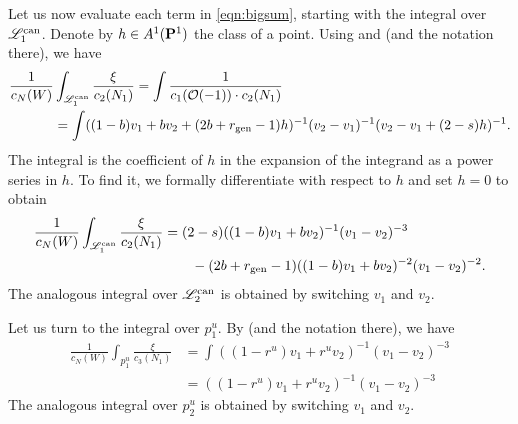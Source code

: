\documentclass{amsart}
\renewcommand{\O}{\mathcal O}
\begin{document}
Let us now evaluate each term in \eqref{eqn:bigsum}, starting with the integral over \(\mathscr L_1^{\rm can}\).
Denote by \(h \in A^1(\P^1)\) the class of a point.
Using  and  (and the notation there), we have
\begin{align*}
  \frac{1}{c_N(W)}&\int_{\mathscr L_1^{\rm can}} \frac{\xi}{c_2(N_1)} = \int \frac{1}{c_1(\O(-1)) \cdot c_2(N_1)} \\
  &= \int ((1-b)v_1+bv_2+ (2b+r_{\rm gen}-1)h)^{-1}(v_2-v_1)^{-1}(v_2-v_{1}+(2-s)h)^{-1}.
\end{align*}
The integral is the coefficient of \(h\) in the expansion of the integrand as a power series in \(h\).
To find it, we formally differentiate with respect to \(h\) and set \(h = 0\) to obtain
\begin{equation}\label{eqn:Lcontrib}
  \begin{split}
    \frac{1}{c_N(W)}\int_{\mathscr L_1^{\rm can}} \frac{\xi}{c_2(N_1)}&=
                                                                                                      (2-s)((1-b)v_1+bv_2)^{-1}(v_1-v_2)^{-3} \\ & \qquad - (2b+r_{\rm gen}-1)((1-b)v_1+bv_2)^{-2}(v_1-v_2)^{-2}.
  \end{split}
\end{equation}
The analogous integral over \(\mathscr L_2^{\rm can}\) is obtained by switching \(v_1\) and \(v_2\).

Let us turn to the integral over \(p_1^u\).
By  (and the notation there), we have
\begin{equation}\label{eqn:p1ucontrib}
  \begin{split}
    \frac{1}{c_N(W)}\int_{p_1^u} \frac{\xi}{c_3(N_1)} &=
                                                                                        \int {((1-r^u) v_1 + r^u v_2)^{-1}(v_1-v_2)^{-3}} \\
                                                                                      &= {((1-r^u) v_1 + r^u v_2)^{-1}(v_1-v_2)^{-3}}
  \end{split}
\end{equation}
The analogous integral over \(p_2^u\) is obtained by switching \(v_1\) and \(v_2\).
\end{document}

